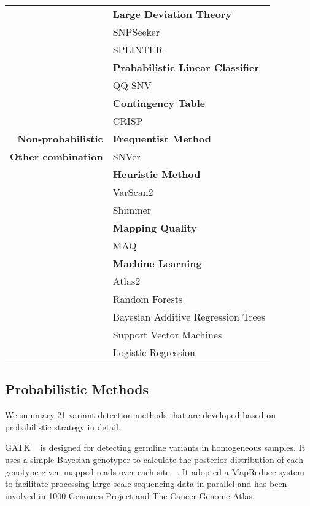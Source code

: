 \documentclass[11pt,reqno]{amsart}
\begin{document}
\begin{table}[htbp]
\begin{tabular}{rr}
          & \multicolumn{1}{l}{\textbf{Large Deviation Theory}} \\
          & \multicolumn{1}{l}{SNPSeeker} \\
          & \multicolumn{1}{l}{SPLINTER} \\
          & \multicolumn{1}{l}{\textbf{Prababilistic Linear Classifier }} \\
          & \multicolumn{1}{l}{QQ-SNV} \\
          & \multicolumn{1}{l}{\textbf{Contingency Table }} \\
          & \multicolumn{1}{l}{CRISP} \\
          \midrule
    \textbf{Non-probabilistic} & \multicolumn{1}{l}{\textbf{Frequentist Method}} \\
    \textbf{Other combination} & \multicolumn{1}{l}{SNVer} \\
         & \multicolumn{1}{l}{\textbf{Heuristic Method}} \\
         & \multicolumn{1}{l}{VarScan2} \\
         & \multicolumn{1}{l}{Shimmer} \\
         & \multicolumn{1}{l}{\textbf{Mapping Quality}} \\
         & \multicolumn{1}{l}{MAQ} \\
         & \multicolumn{1}{l}{\textbf{Machine Learning}} \\
         & \multicolumn{1}{l}{Atlas2} \\
         & \multicolumn{1}{l}{Random Forests} \\
         & \multicolumn{1}{l}{Bayesian Additive Regression Trees} \\
         & \multicolumn{1}{l}{Support Vector Machines} \\
         & \multicolumn{1}{l}{Logistic Regression} \\
    \bottomrule
    \end{tabular}
\end{table}


\subsection{Probabilistic Methods}
We summary 21 variant detection methods that are developed based on probabilistic strategy in detail.

GATK ~\citep{McKenna2010} is designed for detecting germline variants in homogeneous samples.
It uses a simple Bayesian genotyper to calculate the posterior distribution of each genotype given mapped reads over each site ~\citep{depristo2011framework}.
It adopted a MapReduce system to facilitate processing large-scale sequencing data in parallel and has been involved in 1000 Genomes Project and The Cancer Genome Atlas.
\end{document}
